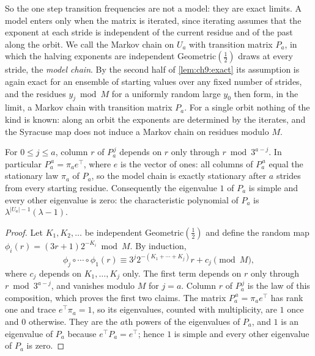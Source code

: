 So the one step transition frequencies are not a model: they are exact
limits. A model enters only when the matrix is iterated, since iterating
assumes that the exponent at each stride is independent of the current residue and of the past along the
orbit. We call the Markov chain on $U_a$ with transition matrix $P_a$, in which the halving exponents are independent Geometric$(\tfrac12)$ draws at every stride, the \emph{model chain}.
By the second half of \cref{lem:ch9:exact} its assumption is again
exact for an ensemble of starting values over any fixed number of strides,
and the residues $y_j\bmod M$ for a uniformly random large $y_0$ then form,
in the limit, a Markov chain with transition matrix $P_a$. For a single orbit
nothing of the kind is known: along an orbit the exponents are determined by the iterates, and the Syracuse map does not induce a Markov chain on residues modulo $M$.

\begin{lemma}\label{lem:ch9:mixing}
For $0\le j\le a$, column $r$ of $P_a^{\,j}$ depends on $r$ only through
$r\bmod3^{a-j}$. In particular $P_a^{\,a}=\pi_ae^{\top}$, where $e$ is the vector of ones: all columns of $P_a^{\,a}$ equal
the stationary law $\pi_a$ of $P_a$, so the model chain is exactly stationary after $a$ strides from every starting residue.
Consequently the eigenvalue $1$ of $P_a$ is simple and every other eigenvalue is zero: the characteristic polynomial of $P_a$ is $\lambda^{|U_a|-1}(\lambda-1)$.
\end{lemma}

\begin{proof}
Let $K_1,K_2,\ldots$ be independent Geometric$(\tfrac12)$ and define the random
map $\phi_i(r)=(3r+1)2^{-K_i}\bmod M$. By induction,
\[
  \phi_j\circ\cdots\circ\phi_1(r)\equiv3^j2^{-(K_1+\cdots+K_j)}r+c_j\pmod M,
\]
where $c_j$ depends on $K_1,\ldots,K_j$ only. The first term depends on $r$ only
through $r\bmod3^{a-j}$, and vanishes modulo $M$ for $j=a$. Column $r$ of
$P_a^{\,j}$ is the law of this composition, which proves the first two claims.
The matrix $P_a^{\,a}=\pi_ae^{\top}$ has rank one and trace $e^{\top}\pi_a=1$, so its eigenvalues, counted with multiplicity, are $1$ once and $0$ otherwise.
They are the $a$th powers of the eigenvalues of $P_a$, and $1$ is an eigenvalue of $P_a$ because $e^{\top}P_a=e^{\top}$; hence $1$ is simple and every other eigenvalue of $P_a$ is zero.
\end{proof}

